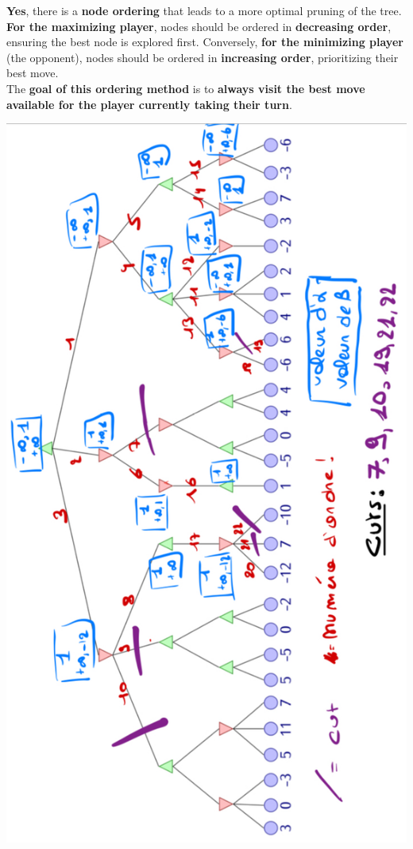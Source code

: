 \documentclass[11pt,a4paper]{report}
\begin{document}
\begin{answers}[8cm]
\footnotesize{\textbf{Yes}, there is a \textbf{node ordering} that leads to a more optimal pruning of the tree. \\
\textbf{For the maximizing player}, nodes should be ordered in \textbf{decreasing order}, ensuring the best node is explored first.
Conversely, \textbf{for the minimizing player} (the opponent), nodes should be ordered in \textbf{increasing order}, prioritizing their best move. \\
The \textbf{goal of this ordering method} is to \textbf{always visit the best move available for the player currently taking their turn}.}
\begin{center}
\includegraphics[angle=-90,scale=.22]{images/reorderedNodes_Alphabeta.png}
\end{center}
\end{answers}
\end{document}
